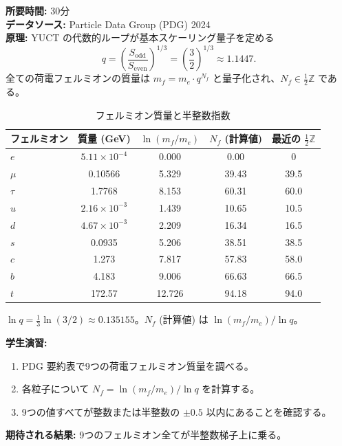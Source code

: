 \documentclass[12pt,a4paper]{article}
\newcommand{\Sodd}{S_{\mathrm{odd}}}
\newcommand{\Seven}{S_{\mathrm{even}}}
\begin{document}
	\textbf{所要時間:} 30分\\
	\textbf{データソース:} Particle Data Group (PDG) 2024 \cite{PDG2024}\\
	\textbf{原理:} YUCT の代数的ループが基本スケーリング量子を定める
	\[
	q = \left( \frac{\Sodd}{\Seven} \right)^{1/3} = \left( \frac{3}{2} \right)^{1/3} \approx 1.1447.
	\]
	全ての荷電フェルミオンの質量は \(m_f = m_e \cdot q^{N_f}\) と量子化され、\(N_f \in \frac{1}{2}\mathbb{Z}\) である。
	
	\begin{table}[H]
		\centering
		\caption{フェルミオン質量と半整数指数}
		\label{tab:fermions}
		\begin{tabular}{l c c c c}
			\toprule
			フェルミオン & 質量 (GeV) & \(\ln(m_f/m_e)\) & \(N_f\) (計算値) & 最近の \(\frac{1}{2}\mathbb{Z}\) \\
			\midrule
			\(e\)   & \(5.11\times10^{-4}\) & 0.000  & 0.00  & 0 \\
			\(\mu\)  & 0.10566 & 5.329  & 39.43 & 39.5 \\
			\(\tau\) & 1.7768  & 8.153  & 60.31 & 60.0 \\
			\(u\)   & \(2.16\times10^{-3}\) & 1.439  & 10.65 & 10.5 \\
			\(d\)   & \(4.67\times10^{-3}\) & 2.209  & 16.34 & 16.5 \\
			\(s\)   & 0.0935  & 5.206  & 38.51 & 38.5 \\
			\(c\)   & 1.273   & 7.817  & 57.83 & 58.0 \\
			\(b\)   & 4.183   & 9.006  & 66.63 & 66.5 \\
			\(t\)   & 172.57  & 12.726 & 94.18 & 94.0 \\
			\bottomrule
		\end{tabular}
		\par\smallskip
		\footnotesize
		\(\ln q = \frac{1}{3}\ln(3/2) \approx 0.135155\)。\(N_f\) (計算値) は \(\ln(m_f/m_e)/\ln q\)。
	\end{table}
	
	\textbf{学生演習:}
	\begin{enumerate}[label=(\arabic*)]
		\item PDG 要約表で9つの荷電フェルミオン質量を調べる。
		\item 各粒子について \(N_f = \ln(m_f / m_e) / \ln q\) を計算する。
		\item 9つの値すべてが整数または半整数の \(\pm 0.5\) 以内にあることを確認する。
	\end{enumerate}
	
	\textbf{期待される結果:} 9つのフェルミオン全てが半整数梯子上に乗る。
	
\end{document}
